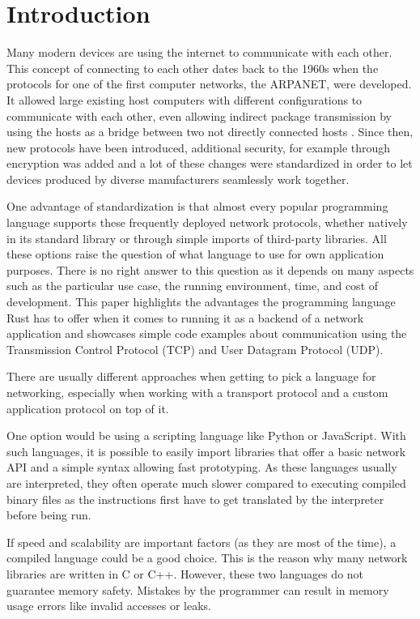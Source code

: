 
\section{Introduction} \label{introduction}
Many modern devices are using the internet to communicate with each other. This concept of connecting to each other
dates back to the 1960s when the protocols for one of the first computer networks, the ARPANET, were developed. It
allowed large existing host computers with different configurations to communicate with each other, even allowing
indirect package transmission by using the hosts as a bridge between two not directly connected hosts \cite{f70arpa}.
Since then, new protocols have been introduced, additional security, for example through encryption was added and a lot
of these changes were standardized in order to let devices produced by diverse manufacturers seamlessly work together.

One advantage of standardization is that almost every popular programming language supports these frequently deployed
network protocols, whether natively in its standard library or through simple imports of third-party libraries. All
these options raise the question of what language to use for own application purposes. There is no right answer to this
question as it depends on many aspects such as the particular use case, the running environment, time, and cost of
development. This paper highlights the advantages the programming language Rust has to offer when it comes to running
it as a backend of a network application and showcases simple code examples about communication using the Transmission
Control Protocol (TCP) and User Datagram Protocol (UDP).

There are usually different approaches when getting to pick a language for networking, especially when working with a
transport protocol and a custom application protocol on top of it.

One option would be using a scripting language like Python or JavaScript. With such languages, it is possible to easily
import libraries that offer a basic network API and a simple syntax allowing fast prototyping. As these languages
usually are interpreted, they often operate much slower compared to executing compiled binary files as the instructions
first have to get translated by the interpreter before being run.

If speed and scalability are important factors (as they are most of the time), a compiled language could be a good
choice. This is the reason why many network libraries are written in C or C++. However, these two languages do not
guarantee memory safety. Mistakes by the programmer can result in memory usage errors like invalid accesses or leaks.

